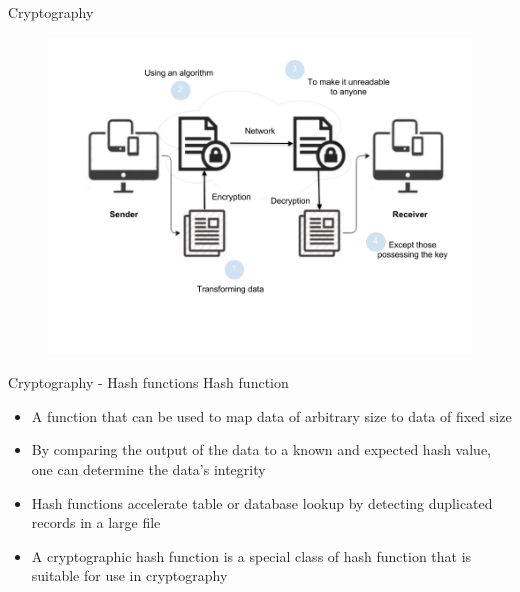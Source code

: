 \documentclass[11pt]{beamer}
\begin{document}


\begin{frame}{Cryptography}
	\begin{figure}[]
		\centering
		\includegraphics  [scale=0.3]{Images/cryptography}
		\begin{centering}
		\end{centering}
	\end{figure}
\end{frame}

\begin{frame}{Cryptography - Hash functions}
	Hash function
	\begin{itemize}
		\item A function that can be used to map data of arbitrary size to data of fixed size
		\item By comparing the output of the data to a known and expected hash value, one can determine the data's integrity
		\item Hash functions accelerate table or database lookup by detecting duplicated records in a large file
		\item A cryptographic hash function is a special class of hash function that is suitable for use in cryptography
	\end{itemize}
\end{frame}

\end{document}
